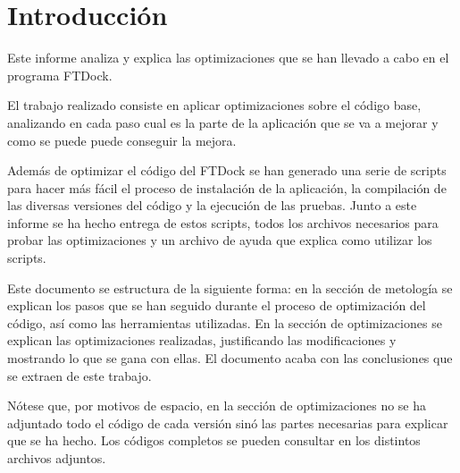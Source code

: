 \section{Introducci\'{o}n}

Este informe analiza y explica las optimizaciones que se han llevado a cabo en
el programa FTDock.

El trabajo realizado consiste en aplicar optimizaciones sobre el c\'{o}digo
base, analizando en cada paso cual es la parte de la aplicaci\'{o}n que se va a
mejorar y como se puede puede conseguir la mejora.

Adem\'{a}s de optimizar el c\'{o}digo del FTDock se han generado una serie de
scripts para hacer m\'{a}s f\'{a}cil el proceso de instalaci\'{o}n de la
aplicaci\'{o}n, la compilaci\'{o}n de las diversas versiones del c\'{o}digo y
la ejecuci\'{o}n de las pruebas. Junto a este informe se ha hecho entrega de
estos scripts, todos los archivos necesarios para probar las optimizaciones y
un archivo de ayuda que explica como utilizar los scripts.

Este documento se estructura de la siguiente forma: en la secci\'{o}n de
metolog\'{i}a se explican los pasos que se han seguido durante el proceso de
optimizaci\'{o}n del c\'{o}digo, as\'{i} como las herramientas utilizadas. En
la secci\'{o}n de optimizaciones se explican las optimizaciones realizadas,
justificando las modificaciones y mostrando lo que se gana con ellas. El
documento acaba con las conclusiones que se extraen de este trabajo.

N\'{o}tese que, por motivos de espacio, en la secci\'{o}n de optimizaciones no
se ha adjuntado todo el c\'{o}digo de cada versi\'{o}n sin\'{o} las partes
necesarias para explicar que se ha hecho. Los c\'{o}digos completos se pueden
consultar en los distintos archivos adjuntos.

